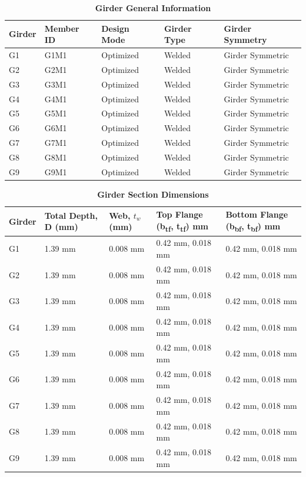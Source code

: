 \documentclass[12pt,a4paper]{report}
\numberwithin{table}{chapter}
\numberwithin{figure}{chapter}
\begin{document}
\newpage

\vspace{0.4em}
\noindent
            
\vspace{4pt}
\begin{longtable}{|L{2.2cm}|L{1.8cm}|p{3.8cm}|p{3.8cm}|p{3.8cm}|}
\caption{\textbf{Girder General Information}}
\hline
\textbf{Girder} & \textbf{Member ID} & \textbf{Design Mode} & \textbf{Girder Type} & \textbf{Girder Symmetry} \\[6pt]
\hline
G1 & G1M1 & Optimized & Welded & Girder Symmetric \\[8pt]
\hline
G2 & G2M1 & Optimized & Welded & Girder Symmetric \\[8pt]
\hline
G3 & G3M1 & Optimized & Welded & Girder Symmetric \\[8pt]
\hline
G4 & G4M1 & Optimized & Welded & Girder Symmetric \\[8pt]
\hline
G5 & G5M1 & Optimized & Welded & Girder Symmetric \\[8pt]
\hline
G6 & G6M1 & Optimized & Welded & Girder Symmetric \\[8pt]
\hline
G7 & G7M1 & Optimized & Welded & Girder Symmetric \\[8pt]
\hline
G8 & G8M1 & Optimized & Welded & Girder Symmetric \\[8pt]
\hline
G9 & G9M1 & Optimized & Welded & Girder Symmetric \\[8pt]
\hline
\end{longtable}

\vspace{0.6em}

\vspace{4pt}
\begin{longtable}{|L{1.8cm}|L{2.3cm}|L{1.8cm}|p{4.8cm}|p{4.8cm}|}
\caption{\textbf{Girder Section Dimensions}}
\hline
\textbf{Girder} & \textbf{Total Depth, D (mm)} & \textbf{Web, $t_w$ (mm)} & \textbf{Top Flange (b\textsubscript{tf}, t\textsubscript{tf}) mm} & \textbf{Bottom Flange (b\textsubscript{bf}, t\textsubscript{bf}) mm} \\[6pt]
\hline
G1 & 1.39 mm & 0.008 mm & 0.42 mm, 0.018 mm & 0.42 mm, 0.018 mm \\[8pt]
\hline
G2 & 1.39 mm & 0.008 mm & 0.42 mm, 0.018 mm & 0.42 mm, 0.018 mm \\[8pt]
\hline
G3 & 1.39 mm & 0.008 mm & 0.42 mm, 0.018 mm & 0.42 mm, 0.018 mm \\[8pt]
\hline
G4 & 1.39 mm & 0.008 mm & 0.42 mm, 0.018 mm & 0.42 mm, 0.018 mm \\[8pt]
\hline
G5 & 1.39 mm & 0.008 mm & 0.42 mm, 0.018 mm & 0.42 mm, 0.018 mm \\[8pt]
\hline
G6 & 1.39 mm & 0.008 mm & 0.42 mm, 0.018 mm & 0.42 mm, 0.018 mm \\[8pt]
\hline
G7 & 1.39 mm & 0.008 mm & 0.42 mm, 0.018 mm & 0.42 mm, 0.018 mm \\[8pt]
\hline
G8 & 1.39 mm & 0.008 mm & 0.42 mm, 0.018 mm & 0.42 mm, 0.018 mm \\[8pt]
\hline
G9 & 1.39 mm & 0.008 mm & 0.42 mm, 0.018 mm & 0.42 mm, 0.018 mm \\[8pt]
\hline
\end{longtable}
\end{document}

